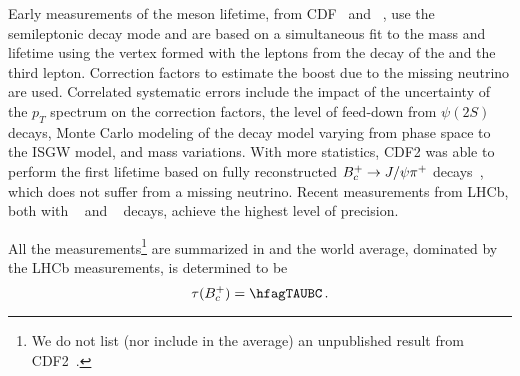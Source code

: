 
Early measurements of the \Bc meson lifetime,
from CDF~\cite{Abe:1998wi,CDFnote9294:2008,Abulencia:2006zu} and \dzero~\cite{Abazov:2008rba},
use the semileptonic decay mode \particle{\Bc \to \jpsi \ell^+ \nu} 
and are based on a 
simultaneous fit to the mass and lifetime using the vertex formed
with the leptons from the decay of the \particle{\jpsi} and
the third lepton. Correction factors
to estimate the boost due to the missing neutrino are used.
Correlated systematic errors include the impact
of the uncertainty of the \Bc $p_T$ spectrum on the correction
factors, the level of feed-down from $\psi(2S)$ decays, 
Monte Carlo modeling of the decay model varying from phase space
to the ISGW model, and mass variations.
With more statistics, CDF2 was able to perform the first \Bc lifetime 
based on fully reconstructed
$B^+_c \to J/\psi \pi^+$ decays~\cite{Aaltonen:2012yb},
which does not suffer from a missing neutrino. Recent measurements from 
LHCb, both with  
\particle{\Bc \to \jpsi \mu^+ \nu}~\cite{Aaij:2014bva} and 
\particle{\Bc \to \jpsi \pi^+}~\cite{Aaij:2014gka} decays, achieve the 
highest level of precision. 

All the measurements\footnote{We do not list (nor include in the average) an unpublished result from CDF2~\cite{CDFnote9294:2008}.}
are summarized in 
 and the world average, dominated by the LHCb measurements, is
determined to be
\begin{equation}
\tau(\Bc) = \hfagTAUBC \,.
\end{equation}

